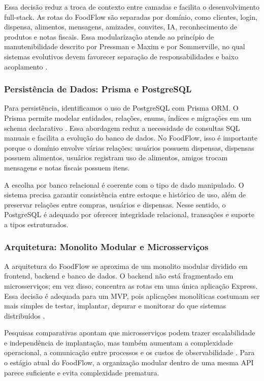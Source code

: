 \documentclass[12pt]{article}
\begin{document}
Essa decisão reduz a troca de contexto entre camadas e facilita o desenvolvimento full-stack. As rotas do FoodFlow são separadas por domínio, como clientes, login, dispensa, alimentos, mensagens, amizades, convites, IA, reconhecimento de produtos e notas fiscais. Essa modularização atende ao princípio de manutenibilidade descrito por Pressman e Maxim e por Sommerville, no qual sistemas evolutivos devem favorecer separação de responsabilidades e baixo acoplamento \cite{pressman,sommerville}.

\subsubsection{Persistência de Dados: Prisma e PostgreSQL}

Para persistência, identificamos o uso de PostgreSQL com Prisma ORM. O Prisma permite modelar entidades, relações, enums, índices e migrações em um schema declarativo \cite{prisma}. Essa abordagem reduz a necessidade de consultas SQL manuais e facilita a evolução do banco de dados. No FoodFlow, isso é importante porque o domínio envolve várias relações: usuários possuem dispensas, dispensas possuem alimentos, usuários registram uso de alimentos, amigos trocam mensagens e notas fiscais possuem itens.

A escolha por banco relacional é coerente com o tipo de dado manipulado. O sistema precisa garantir consistência entre estoque e histórico de uso, além de preservar relações entre compras, usuários e dispensas. Nesse sentido, o PostgreSQL é adequado por oferecer integridade relacional, transações e suporte a tipos estruturados.

\subsubsection{Arquitetura: Monolito Modular e Microsserviços}

A arquitetura do FoodFlow se aproxima de um monolito modular dividido em frontend, backend e banco de dados. O backend não está fragmentado em microsserviços; em vez disso, concentra as rotas em uma única aplicação Express. Essa decisão é adequada para um MVP, pois aplicações monolíticas costumam ser mais simples de testar, implantar, depurar e monitorar do que sistemas distribuídos \cite{blinowski2022}.

Pesquisas comparativas apontam que microsserviços podem trazer escalabilidade e independência de implantação, mas também aumentam a complexidade operacional, a comunicação entre processos e os custos de observabilidade \cite{blinowski2022}. Para o estágio atual do FoodFlow, a organização modular dentro de uma mesma API parece suficiente e evita complexidade prematura.
\end{document}
